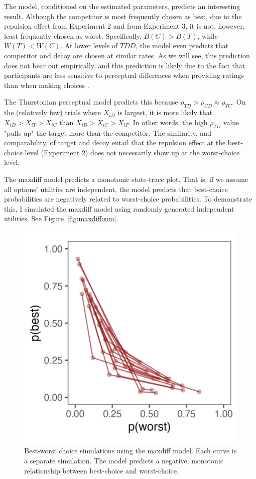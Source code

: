 The model, conditioned on the estimated parameters, predicts an interesting result. Although the competitor is most frequently chosen as best, due to the repulsion effect from Experiment 2 and from \textcite{spektorWhenGoodLooks2018b} Experiment 3, it is not, however, least frequently chosen as worst. Specifically, $B(C)>B(T)$, while $W(T)<W(C)$. At lower levels of $TDD$, the model even predicts that competitor and decoy are chosen at similar rates. As we will see, this prediction does not bear out empirically, and this prediction is likely due to the fact that participants are less sensitive to perceptual differences when providing ratings than when making choices \parencite{gronau2023choice}.

The Thurstonian perceptual model predicts this because $\rho_{TD}>\rho_{CD}\approx\rho_{TC}$. On the (relatively few) trials where $X_{iD}$ is largest, it is more likely that $X_{iD}>X_{iT}>X_{iC}$ than $X_{iD}>X_{iC}>X_{iT}$. In other words, the high $\rho_{TD}$ value "pulls up" the target more than the competitor. The similarity, and comparability, of target and decoy entail that the repulsion effect at the best-choice level (Experiment 2) does not necessarily show up at the worst-choice level.

The maxdiff model predicts a monotonic state-trace plot. That is, if we assume all options' utilities are independent, the model predicts that best-choice probabilities are negatively related to worst-choice probabilities. To demonstrate this, I simulated the maxdiff model using randomly generated independent utilities. See Figure~\ref{fig:maxdiff:sim}. 

\begin{figure}
   \includegraphics[width=150mm]{figures/maxdiff_sim_monotonic.jpeg}
   \caption{Best-worst choice simulations using the maxdiff model. Each curve is a separate simulation. The model predicts a negative, monotonic relationship between best-choice and worst-choice.}
   \label{fig:maxdiff_sim}
\end{figure}


